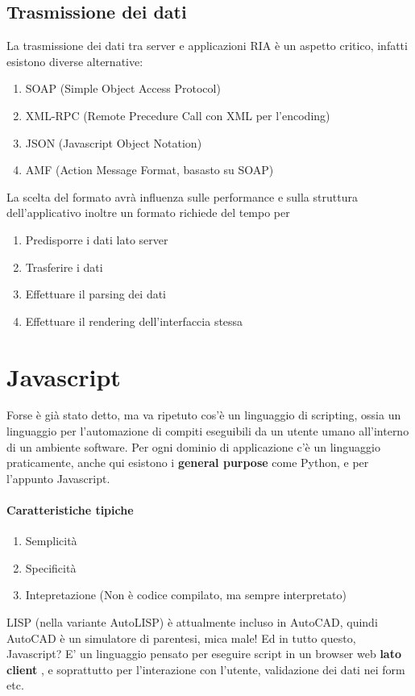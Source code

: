 \documentclass[12pt, a4paper, openany, twoside]{book}
\begin{document}
\subsection{Trasmissione dei dati}
La trasmissione dei dati tra server e applicazioni RIA è un aspetto critico, 
infatti esistono diverse alternative:
\begin{enumerate}
	\item SOAP (Simple Object Access Protocol)
	\item XML-RPC (Remote Precedure Call con XML per l'encoding)
	\item JSON (Javascript Object Notation)
	\item AMF (Action Message Format, basasto su SOAP)
\end{enumerate}
La scelta del formato avrà influenza sulle performance e sulla struttura dell'applicativo
inoltre un formato richiede del tempo per
\begin{enumerate}
	\item Predisporre i dati lato server
	\item Trasferire i dati
	\item Effettuare il parsing dei dati
	\item Effettuare il rendering dell'interfaccia stessa
\end{enumerate}
\section{Javascript}
Forse è già stato detto, ma va ripetuto cos'è un linguaggio di scripting, ossia
un linguaggio per l'automazione di compiti eseguibili da un utente umano 
all'interno di un ambiente software. Per ogni dominio di applicazione c'è un 
linguaggio praticamente, anche qui esistono i \textbf{general purpose} come
Python, e per l'appunto Javascript.
\paragraph{Caratteristiche tipiche}
\begin{enumerate}
	\item Semplicità
	\item Specificità
	\item Intepretazione (Non è codice compilato, ma sempre interpretato)
\end{enumerate}
LISP (nella variante AutoLISP) è attualmente incluso in AutoCAD, quindi 
AutoCAD è un simulatore di parentesi, mica male! Ed in tutto questo, Javascript?
E' un linguaggio pensato per eseguire script in un browser web \textbf{lato client}
, e soprattutto per l'interazione con l'utente, validazione dei dati nei form etc.
\end{document}
